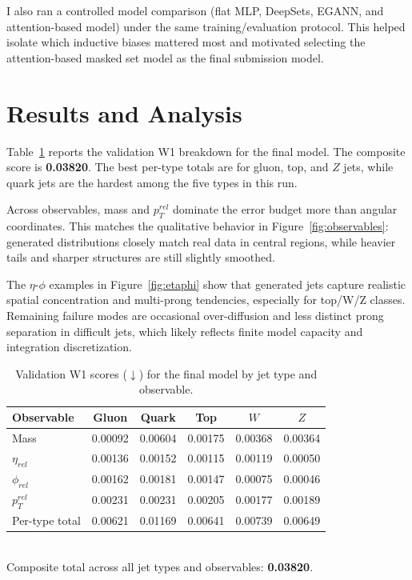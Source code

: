 \documentclass{article}
\begin{document}
I also ran a controlled model comparison (flat MLP, DeepSets, EGANN, and attention-based model) under the same training/evaluation protocol. This helped isolate which inductive biases mattered most and motivated selecting the attention-based masked set model as the final submission model.

\section{Results and Analysis}

Table~\ref{tab:w1} reports the validation W1 breakdown for the final model. The composite score is \textbf{0.03820}. The best per-type totals are for gluon, top, and $Z$ jets, while quark jets are the hardest among the five types in this run.

Across observables, mass and $p_T^{rel}$ dominate the error budget more than angular coordinates. This matches the qualitative behavior in Figure~\ref{fig:observables}: generated distributions closely match real data in central regions, while heavier tails and sharper structures are still slightly smoothed.

The $\eta$-$\phi$ examples in Figure~\ref{fig:etaphi} show that generated jets capture realistic spatial concentration and multi-prong tendencies, especially for top/W/Z classes. Remaining failure modes are occasional over-diffusion and less distinct prong separation in difficult jets, which likely reflects finite model capacity and integration discretization.

\begin{table}[t]
\centering
\caption{Validation W1 scores ($\downarrow$) for the final model by jet type and observable.}
\label{tab:w1}
\begin{tabular}{@{}lccccc@{}}
\toprule
Observable & Gluon & Quark & Top & $W$ & $Z$ \\
\midrule
Mass & 0.00092 & 0.00604 & 0.00175 & 0.00368 & 0.00364 \\
$\eta_{rel}$ & 0.00136 & 0.00152 & 0.00115 & 0.00119 & 0.00050 \\
$\phi_{rel}$ & 0.00162 & 0.00181 & 0.00147 & 0.00075 & 0.00046 \\
$p_T^{rel}$ & 0.00231 & 0.00231 & 0.00205 & 0.00177 & 0.00189 \\
\midrule
Per-type total & 0.00621 & 0.01169 & 0.00641 & 0.00739 & 0.00649 \\
\bottomrule
\end{tabular}
\\[0.3em]
\small Composite total across all jet types and observables: \textbf{0.03820}.
\end{table}
\end{document}
